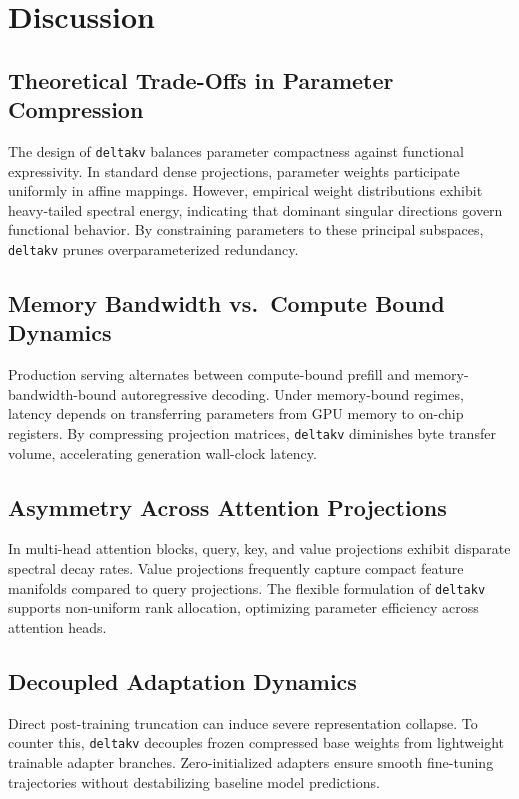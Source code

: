 \section{Discussion}

\subsection{Theoretical Trade-Offs in Parameter Compression}
The design of \texttt{deltakv} balances parameter compactness against functional expressivity. In standard dense projections, parameter weights participate uniformly in affine mappings. However, empirical weight distributions exhibit heavy-tailed spectral energy, indicating that dominant singular directions govern functional behavior. By constraining parameters to these principal subspaces, \texttt{deltakv} prunes overparameterized redundancy.

\subsection{Memory Bandwidth vs.\ Compute Bound Dynamics}
Production serving alternates between compute-bound prefill and memory-bandwidth-bound autoregressive decoding. Under memory-bound regimes, latency depends on transferring parameters from GPU memory to on-chip registers. By compressing projection matrices, \texttt{deltakv} diminishes byte transfer volume, accelerating generation wall-clock latency.

\subsection{Asymmetry Across Attention Projections}
In multi-head attention blocks, query, key, and value projections exhibit disparate spectral decay rates. Value projections frequently capture compact feature manifolds compared to query projections. The flexible formulation of \texttt{deltakv} supports non-uniform rank allocation, optimizing parameter efficiency across attention heads.

\subsection{Decoupled Adaptation Dynamics}
Direct post-training truncation can induce severe representation collapse. To counter this, \texttt{deltakv} decouples frozen compressed base weights from lightweight trainable adapter branches. Zero-initialized adapters ensure smooth fine-tuning trajectories without destabilizing baseline model predictions.

